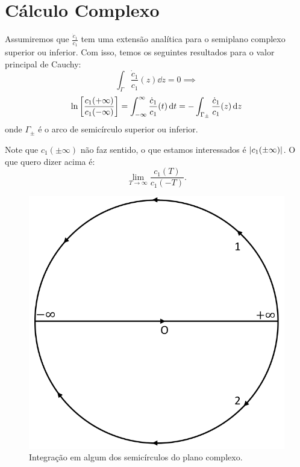 \documentclass[a4paper,fleqn,12pt]{article}
\begin{document}
\section{Cálculo Complexo}

Assumiremos que $\frac{\dot{c}_1}{c_1}$ tem uma extensão analítica para o semiplano complexo superior ou inferior. Com isso, temos os seguintes resultados para o valor principal de Cauchy:
$$
\int_{\Gamma} \frac{\dot{c}_1}{c_1}(z) \dd{z} = 0 \implies
$$
$$
\ln\qty[\frac{c_1(+\infty)}{c_1(-\infty)}] = \int_{-\infty}^\infty \frac{\dot{c}_1}
{c_1}(t) \dd{t} = - \int_{\Gamma_{\pm}} \frac{\dot{c}_1}{c_1}(z) \dd{z}
$$
onde $\Gamma_{\pm}$ é o arco de semicírculo superior ou inferior.

\n

\begin{obs}
\rm Note que $c_1(\pm \infty)$ não faz sentido, o que estamos interessados é $\abs{c_1(\pm \infty)}$. O que quero dizer acima é:
$$
\lim_{T \to \infty} \frac{c_1(T)}{c_1(-T)}.
$$
\end{obs}

\begin{figure}[H]
\centering
\includegraphics[scale=0.3]{figures/semicirculo.png}
\caption{Integração em algum dos semicírculos do plano complexo.}
\label{fig:semicirculo}
\end{figure}
\end{document}

